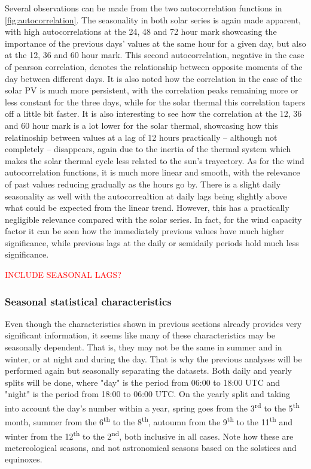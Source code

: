 Several observations can be made from the two autocorrelation functions in \autoref{fig:autocorrelation}. The seasonality in both solar series is again made apparent, with high autocorrelations at the 24, 48 and 72 hour mark showcasing the importance of the previous days' values at the same hour for a given day, but also at the 12, 36 and 60 hour mark. This second autocorrelation, negative in the case of pearson correlation, denotes the relationship between opposite moments of the day between different days. It is also noted how the correlation in the case of the solar PV is much more persistent, with the correlation peaks remaining more or less constant for the three days, while for the solar thermal this correlation tapers off a little bit faster. It is also interesting to see how the correlation at the 12, 36 and 60 hour mark is a lot lower for the solar thermal, showcasing how this relatinoship between values at a lag of 12 hours practically -- although not completely -- disappears, again due to the inertia of the thermal system which makes the solar thermal cycle less related to the sun's trayectory. As for the wind autocorrelation functions, it is much more linear and smooth, with the relevance of past values reducing gradually as the hours go by. There is a slight daily seasonality as well with the autocorrealtion at daily lags being slightly above what could be expected from the linear trend. However, this has a practically negligible relevance compared with the solar series. In fact, for the wind capacity factor it can be seen how the immediately previous values have much higher significance, while previous lags at the daily or semidaily periods hold much less significance. 

\textcolor{red}{INCLUDE SEASONAL LAGS?}
\subsubsection{Seasonal statistical characteristics}
Even though the characteristics shown in previous sections already provides very significant information, it seems like many of these characteristics may be seasonally dependent. That is, they may not be the same in summer and in winter, or at night and during the day. That is why the previous analyses will be performed again but seasonally separating the datasets. Both daily and yearly splits will be done, where "day" is the period from 06:00 to 18:00 UTC and "night" is the period from 18:00 to 06:00 UTC. On the yearly split and taking into account the day's number within a year, spring goes from the 3\textsuperscript{rd} to the 5\textsuperscript{th} month, summer from the 6\textsuperscript{th} to the 8\textsuperscript{th}, autoumn from the 9\textsuperscript{th} to the 11\textsuperscript{th} and winter from the 12\textsuperscript{th} to the 2\textsuperscript{nd}, both inclusive in all cases. Note how these are metereological seasons, and not astronomical seasons based on the solstices and equinoxes. 

